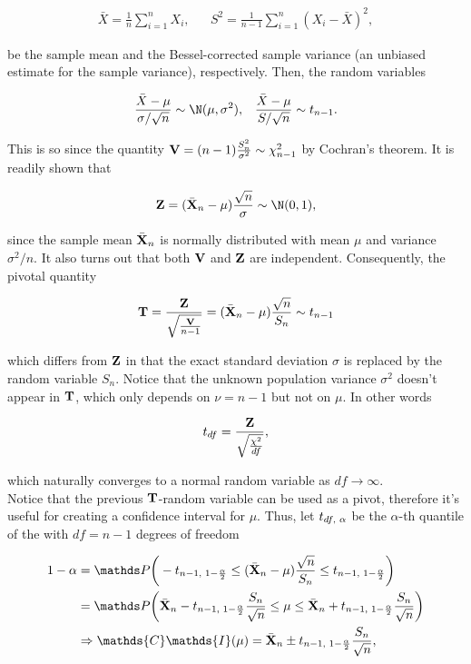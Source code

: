 \documentclass{homework}
\begin{document}
\begin{align*}
{\displaystyle {\bar {X}}={\frac {1}{n}}\sum _{i=1}^{n}X_{i}}, && {\displaystyle S^{2}={\frac {1}{n-1}}\sum _{i=1}^{n}(X_{i}-{\bar {X}})^{2}},
\end{align*}

be the sample mean and the Bessel-corrected sample variance (an unbiased estimate for the sample variance), respectively. Then, the random variables 

\begin{align*}
    {\displaystyle {\frac {{\bar {X}}-\mu }{\sigma /{\sqrt {n}}}} \sim \N(\mu,\sigma^2)}, && {\displaystyle {\frac {{\bar {X}}-\mu }{S/{\sqrt {n}}}} \sim t_{n-1}}.
\end{align*}

This is so since the quantity ${\bf V} = (n-1) \frac{S_{n}^2}{\sigma^2} \sim \chi^2_{n-1}$ by Cochran's theorem. It is readily shown that 

$$
{\bf Z} = (\bar{\X}_n - \mu) \frac{\sqrt{n}}{\sigma} \sim \N(0,1),
$$

since the sample mean $\bar{{\bf X}}_n$ is normally distributed with mean $\mu$ and variance $\sigma^2/n$. It also turns out that both ${\bf V}$ and ${\bf Z}$ are independent. Consequently, the pivotal quantity

$$
{\bf T} = \frac{{\bf Z}}{\sqrt{\frac{{\bf V}}{n-1}}} =  (\bar{{\bf X}}_n - \mu) \frac{\sqrt{n}}{S_n} \sim t_{n-1}
$$

which differs from ${\bf Z}$ in that the exact standard deviation $\sigma$ is replaced by the random variable  $S_n$. Notice that the unknown population variance $\sigma^2$ doesn't appear in ${\bf T}$, which only depends on $\nu = n-1$ but not on $\mu$. In other words

$$
t_{df} = \frac{{\bf Z}}{\sqrt{\frac{\chi^2}{df}}},
$$

which naturally converges to a normal random variable as $df \rightarrow \infty$. \\

Notice that the previous ${\bf T}$-random variable can be used as a pivot, therefore it's useful for creating a confidence interval for $\mu$. Thus, let $t_{df, \textnormal{ } \alpha}$ be the $\alpha$-th quantile of the \tdis with $df = n-1$ degrees of freedom

\begin{align*}
    1-\alpha &= \prob \bigg( -t_{n-1, \textnormal{ } 1-\frac{\alpha}{2}} \leq (\bar{\X}_n - \mu) \frac{\sqrt{n}}{S_n} \leq t_{n-1, \textnormal{ } 1-\frac{\alpha}{2}} \bigg) \\
    &= \prob \bigg(\bar{\X}_n -t_{n-1, \textnormal{ } 1-\frac{\alpha}{2}} \frac{S_n}{\sqrt{n}} \leq \mu \leq \bar{\X}_n +t_{n-1, \textnormal{ } 1-\frac{\alpha}{2}} \frac{S_n}{\sqrt{n}}\bigg) \\
    &\Rightarrow \mathds{C}\mathds{I}(\mu) = \bar{\X}_n \pm t_{n-1, \textnormal{ } 1-\frac{\alpha}{2}} \frac{S_n}{\sqrt{n}}, 
\end{align*}
\end{document}
